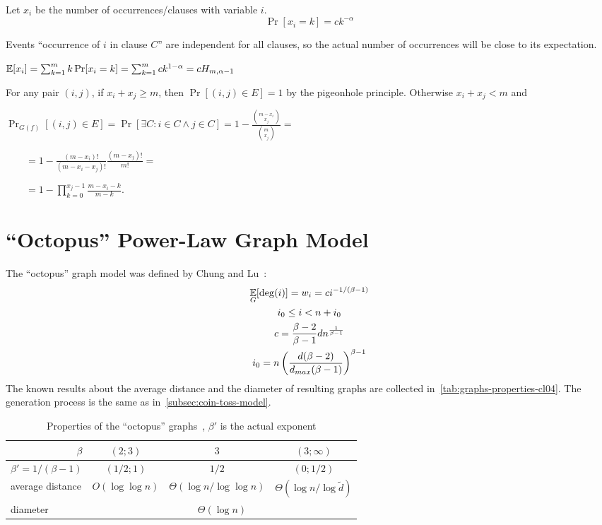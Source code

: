 Let $x_i$ be the number of occurrences/clauses with variable $i$.
\begin{equation}
    \Pr[x_i=k]=ck^{-\alpha}
\end{equation}

Events ``occurrence of $i$ in clause $C$'' are independent for all clauses,
so the actual number of occurrences will be close to its expectation.

$\mathop{{}\mathbb{E}}[x_i]=\sum_{k=1}^m{k\Pr[x_i=k]}=\sum_{k=1}^m{ck^{1-\alpha}}=cH_{m,\alpha-1}$

For any pair $(i,j)$, if $x_i+x_j\geq m$, then $\Pr[(i,j)\in E]=1$ by the pigeonhole principle.
Otherwise $x_i+x_j<m$ and

$\Pr_{G(f)}[(i,j)\in E]=\Pr[\exists C:i\in C\land j\in C]
=1-\frac{\binom{m-x_i}{x_j}}{\binom{m}{x_j}}=$

$\qquad=1-\frac{(m-x_i)!}{(m-x_i-x_j)!}\frac{(m-x_j)!}{m!}=$

$\qquad=1-\prod_{k=0}^{x_j-1}{\frac{m-x_i-k}{m-k}}$.

\section{\texorpdfstring{``Octopus''}{"Octopus"} Power-Law Graph Model}
\label{sec:powerlaw-octopus-model}

The ``octopus'' graph model was defined by Chung and Lu~\cite{cl04}:
\begin{gather}
    \mathop{{}\mathbb{E}}_G[\deg(i)]=w_i=ci^{-1/(\beta-1)}\\
    i_0\leq i<n+i_0\\
    c=\frac{\beta-2}{\beta-1}dn^{\frac{1}{\beta-1}}\\
    i_0=n\left(\frac{d(\beta-2)}{d_{max}(\beta-1)}\right)^{\beta-1}
\end{gather}
The known results about the average distance and the diameter of resulting graphs
are collected in~\autoref{tab:graphs-properties-cl04}.
The generation process is the same as in~\autoref{subsec:coin-toss-model}.

\begin{table}
    \begin{center}
        \caption[Properties of the ``octopus'' graphs~\cite{cl04}]
                {Properties of the ``octopus'' graphs~\cite{cl04}, $\beta'$ is the actual exponent}
        \label{tab:graphs-properties-cl04}
        \renewcommand*{\arraystretch}{1.3}
        \begin{tabular}{|l|c|c|c|}
            \hline
            \multicolumn{1}{|r|}{$\beta$} & $(2;3)$ & $3$ & $(3;\infty)$\\
            \hline
            \multicolumn{1}{|r|}{$\beta'=1/(\beta-1)$} & $(1/2;1)$ & $1/2$ & $(0;1/2)$\\
            \hline\hline
            average distance & $O(\log\log n)$ & $\Theta(\log n/\log\log n)$ & $\Theta(\log n/\log \tilde{d})$\\
            \hline
            diameter & \multicolumn{3}{|c|}{$\Theta(\log n)$}\\
            \hline
        \end{tabular}
    \end{center}
\end{table}


